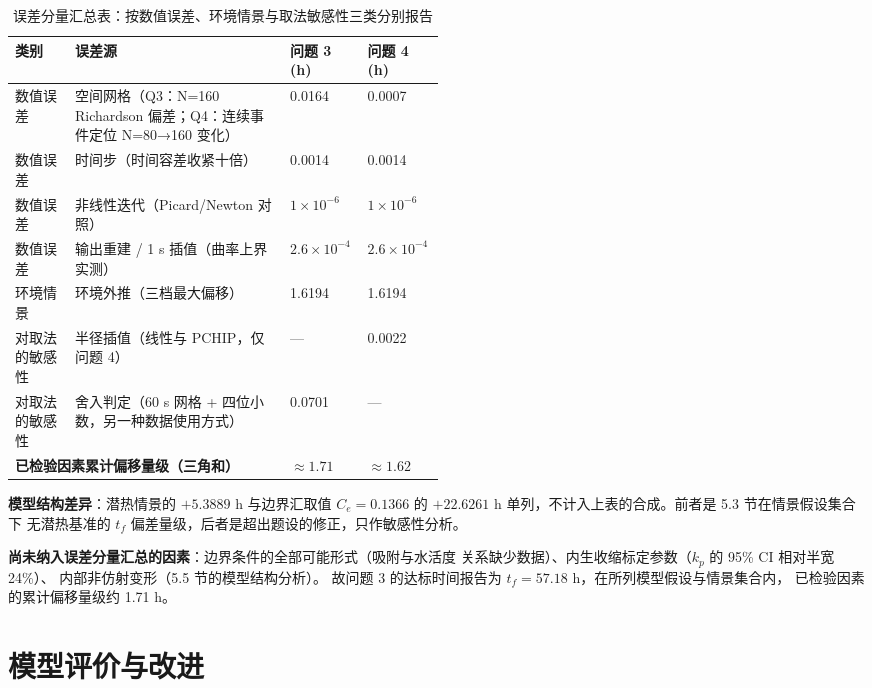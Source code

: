 \documentclass[12pt,a4paper]{ctexart}
\numberwithin{equation}{section}
\begin{document}
\begin{table}[htbp]
\centering
\caption{误差分量汇总表：按数值误差、环境情景与取法敏感性三类分别报告}
\label{tab:预算}
\small
\begin{tabular}{lp{0.50\linewidth}ll}
\toprule
类别 & 误差源 & 问题 3 (h) & 问题 4 (h) \\
\midrule
数值误差 & 空间网格（Q3：N=160 Richardson 偏差；Q4：连续事件定位 N=80→160 变化） & 0.0164 & 0.0007 \\
数值误差 & 时间步（时间容差收紧十倍） & 0.0014 & 0.0014 \\
数值误差 & 非线性迭代（Picard/Newton 对照） & $1\times10^{-6}$ & $1\times10^{-6}$ \\
数值误差 & 输出重建 / 1 s 插值（曲率上界实测） & $2.6\times10^{-4}$ & $2.6\times10^{-4}$ \\
环境情景 & 环境外推（三档最大偏移） & 1.6194 & 1.6194 \\
对取法的敏感性 & 半径插值（线性与 PCHIP，仅问题 4） & — & 0.0022 \\
对取法的敏感性 & 舍入判定（60 s 网格 + 四位小数，另一种数据使用方式） & 0.0701 & — \\
\midrule
\multicolumn{2}{l}{\textbf{已检验因素累计偏移量级（三角和）}} & $\approx1.71$ & $\approx1.62$ \\
\bottomrule
\end{tabular}
\end{table}

\textbf{模型结构差异}：潜热情景的 $+5.3889$ h 与边界汇取值 $C_e=0.1366$ 的
$+22.6261$ h 单列，不计入上表的合成。前者是 5.3 节在情景假设集合下
无潜热基准的 $t_f$ 偏差量级，后者是超出题设的修正，只作敏感性分析。

\textbf{尚未纳入误差分量汇总的因素}：边界条件的全部可能形式（吸附与水活度
关系缺少数据）、内生收缩标定参数（$k_p$ 的 95\% CI 相对半宽 24\%）、
内部非仿射变形（5.5 节的模型结构分析）。
故问题 3 的达标时间报告为 $t_f=57.18$ h，在所列模型假设与情景集合内，
已检验因素的累计偏移量级约 1.71 h。

\section{模型评价与改进}
\end{document}
